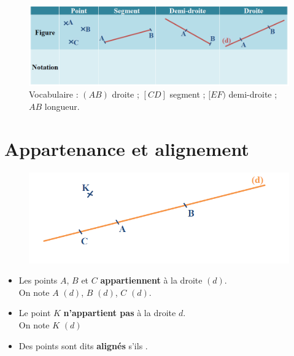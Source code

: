 \begin{figure}[h]
	\centering
	\includegraphics[width=1\linewidth]{../../assets/images/6e/seq_02/points_segment_droites}
	\caption{Vocabulaire : $(AB)$ droite ; $[CD]$ segment ; $[EF)$ demi-droite ; $AB$ longueur.}
	\label{fig:vocab-points-droites}
\end{figure}

\newpage
\section{ Appartenance et alignement}

\begin{figure}[h]
	\centering
	\includegraphics[width=1\linewidth]{../../assets/images/6e/seq_02/pt_sur_dte}
	
	\label{fig:point-sur-droite}
\end{figure}

\begin{definitionbox}
\begin{itemize}[label = \textbullet]
	\item Les points $A$, $B$ et $C$ \textbf{appartiennent} à la droite $(d)$.\\
	On note $A$ \trou{1cm} $(d)$, $B$ \trou{1cm} $(d)$, $C$ \trou{1cm} $(d)$.
	\item Le point $K$ \textbf{n'appartient pas} à la droite $d$. \\
	On note $K$ \trou{1cm} $(d)$
	\item Des points sont dits \textbf{alignés} s'ils \trou{6cm}.
\end{itemize}

\end{definitionbox}

